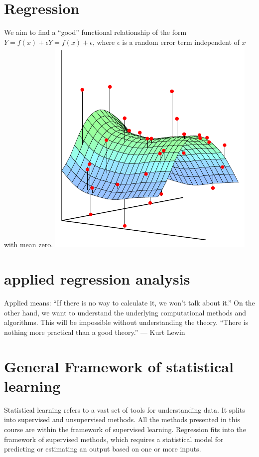 \documentclass[11pt]{article}
\begin{document}
\section{Regression}\label{sec:Regression}
We aim to find a ``good'' functional relationship of the form $Y=f(x)+\epsilon Y = f(x) + \epsilon$, where $\epsilon$ is a random error term independent of $x$ with mean zero.
\includegraphics{figure-1-1-1}
\blindtext

\section{applied regression analysis}\label{sec:applied regression analysis}
Applied means: ``If there is no way to calculate it, we won't talk about it.''
On the other hand, we want to understand the underlying computational methods and algorithms.
This will be impossible without understanding the theory.
``There is nothing more practical than a good theory.''
— Kurt Lewin
\blindtext

\section{General Framework of statistical learning}\label{sec:General-framework-of-statistical-learning}
Statistical learning refers to a vast set of tools for understanding data.
It splits into supervised and unsupervised methods.
All the methods presented in this course are within the framework of supervised learning.
Regression fits into the framework of supervised methods, which requires a statistical model for predicting or estimating an output based on one or more inputs.
\end{document}
